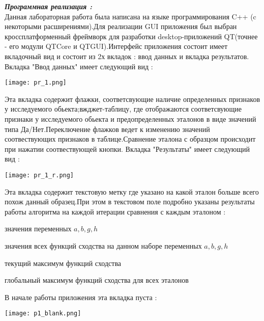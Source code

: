 \documentclass[a4paper,12pt]{article}
\begin{document}
 	\begin{flushleft}
 		\textit{\textbf{Программная реализация :}}
			\\
			\medskip
			\hangindent=1.5cm  \noindent
			Данная лабораторная работа была написана на языке программирования C++ (c некоторыми расширениями).Для реализации GUI приложения был выбран кроссплатформенный фреймворк для разработки desktop-приложений QT(точнее - его модули  QTCore и QTGUI).Интерфейс приложения состоит имеет вкладочный вид и состоит из 2х вкладок : ввод данных и вкладка результатов.\\
			\medskip
			Вкладка "Ввод данных" имеет следующий вид :
			\begin{center}
				\texttt{[image: pr\_1.png]}
			\end{center}
			Эта вкладка содержит флажки, соответсвующие наличие определенных признаков у исследуемого обьекта;вжджет-таблицу, где отображаются соответсвующие признаки у исследуемого обьекта и предопределенных эталонов в виде значений типа Да/Нет.Переключение флажков ведет к изменению значений соотвествующих признаков в таблице.Сравнение эталона с образцом происходит при нажатии соотвествующей кнопки.
			\newpage
			Вкладка "Результаты" имеет следующий вид :
			\begin{center}
				\texttt{[image: pr\_1\_r.png]}
			\end{center}			
			Эта вкладка содержит текстовую метку где указано на какой эталон больше всего похож данный образец.При этом в текстовом поле подробно указаны результаты работы алгоритма на каждой итерации сравнения с каждым эталоном :
			\begin{list}{}{\leftmargin=3cm}
					\item значения переменных ${a,b,g,h}$
					\item значения всех функций сходства на данном наборе переменных ${a,b,g,h}$
					\item текущий максимум функций сходства
					\item глобальный максимум функций сходства для всех эталонов
			\end{list}
			В начале работы приложения эта вкладка пуста :
			\begin{center}
				\texttt{[image: p1\_blank.png]}
			\end{center}			
	\end{flushleft}
\end{document}
